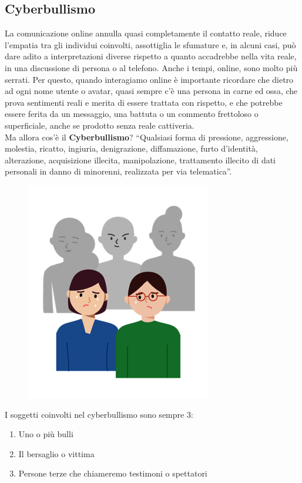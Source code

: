 \documentclass{article}
\begin{document}
\subsection{Cyberbullismo}
La comunicazione online annulla quasi completamente il contatto reale, riduce l’empatia tra gli individui coinvolti, assottiglia le sfumature e, in alcuni casi, può dare adito a interpretazioni diverse rispetto a quanto accadrebbe nella vita reale, in una discussione di persona o al telefono. Anche i tempi, online, sono molto più serrati. Per questo, quando interagiamo online è importante ricordare che dietro ad ogni nome utente o avatar, quasi sempre c'è una persona in carne ed ossa, che prova sentimenti reali e merita di essere trattata con rispetto, e che potrebbe essere ferita da un messaggio, una battuta o un commento frettoloso o superficiale, anche se prodotto senza reale cattiveria.\\
Ma allora cos'è il \textbf{Cyberbullismo}? “Qualsiasi forma di pressione, aggressione, molestia, ricatto, ingiuria, denigrazione, diffamazione, furto d’identità, alterazione, acquisizione illecita, manipolazione, trattamento illecito di dati personali in danno di minorenni, realizzata per via telematica”.\\
\begin{figure}[h!]
	\centering
	\includegraphics[scale=0.5]{Bullismo1.png}
\end{figure}
I soggetti coinvolti nel cyberbullismo sono sempre 3:
\begin{enumerate}
	\item Uno o più bulli
	\item Il bersaglio o vittima
	\item Persone terze che chiameremo testimoni o spettatori
\end{enumerate}
\end{document}
